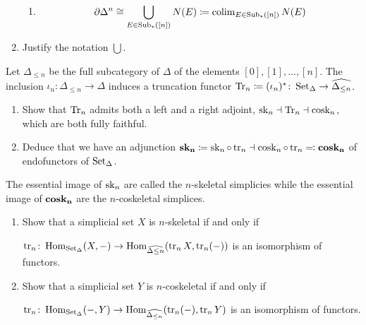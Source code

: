 \begin{Exercise}
\begin{enumerate}[label=(\alph*)]
\begin{enumerate}
            \item 
            \[
                \partial \Delta^n
                \cong
                \bigcup_{ E \in \operatorname{Sub}_* ( [ n ] ) } N ( E ) \coloneqq 
                \operatorname{colim}_{ E \in \operatorname{Sub}_* ( [ n ] ) } N ( E ) 
            \]
        \end{enumerate}
    
        \item 
        Justify the notation $ \bigcup $.
        
    \end{enumerate}
\end{Exercise}

\begin{Exercise}
    Let $ \Delta_{ \leq n } $ be the full subcategory of $ \Delta $ of the elements $ [ 0 ] , [ 1 ] , \dotsc , [ n ] $.
    The inclusion $ \iota_n \colon \Delta_ { \leq n } \to \Delta $ induces a truncation functor $ \operatorname{Tr}_n \coloneqq ( \iota_n )^* \colon \operatorname{Set}_{ \Delta } \to \widehat{ \Delta_ { \leq n } } $.

    \begin{enumerate}[label=(\alph*)]
        
        \item 
        Show that $ \operatorname{Tr}_n $ admits both a left and a right adjoint, $ \operatorname{sk}_n \dashv \operatorname{Tr}_n \dashv \operatorname{cosk}_n $, which are both fully faithful.
    
        \item 
        Deduce that we have an adjunction $ \bold{sk_n} \coloneqq \operatorname{sk}_n \circ \operatorname{tr}_n \dashv \operatorname{cosk}_n \circ\operatorname{tr}_n \eqqcolon \bold{ cosk_n } $ of endofunctors of $ \operatorname{Set}_{\Delta} $.
        
    \end{enumerate}
    
    The essential image of $ \operatorname{sk}_n $ are called the $ n $-skeletal simplicies while the essential image of $ \bold { cosk_n } $ are the $ n $-coskeletal simplices.
    
    \begin{enumerate}[label=(\alph*), resume]
        \item 
        Show that a simplicial set $ X $ is $ n $-skeletal if and only if 
        
        $ \operatorname{tr}_n \colon \operatorname{Hom}_{ \operatorname{Set}_{\Delta} } ( X , - ) \to \operatorname{Hom}_{ \widehat{ \Delta{ \leq n }}} ( \operatorname{tr}_n X , \operatorname{tr}_n ( - ) ) $ is an isomorphism of functors.
    
        \item 
        Show that a simplicial set $ Y $ is $ n $-coskeletal if and only if
        
        $ \operatorname{tr}_n \colon \operatorname{Hom}_{ \operatorname{Set}_\Delta } ( - , Y ) \to \operatorname{Hom}_{ \widehat{ \Delta_{ \leq n }} } ( \operatorname{tr}_n ( - ) , \operatorname{tr}_n Y ) $ is an isomorphism of functors.
    \end{enumerate}
\end{Exercise}

